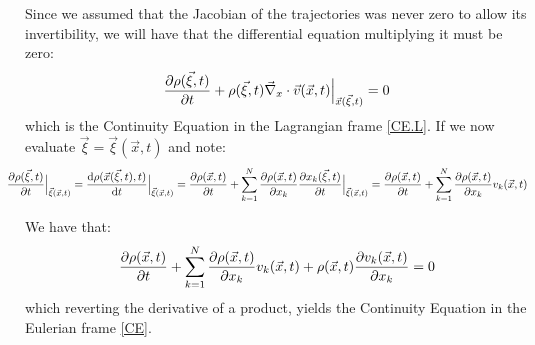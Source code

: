 \documentclass[11pt, a4paper]{article} %
\begin{document}
Since we assumed that the Jacobian of the trajectories was never zero to allow its invertibility, we will have that the differential equation multiplying it must be zero:
\begin{equation}
\pdv{\rho(\vec{\xi},t)}{t}+\rho(\vec{\xi},t)\vec{\nabla}_x\cdot\vec{v}(\vec{x},t)\Big\rvert_{\vec{x}(\vec{\xi},t)}=0
\end{equation}
which is the Continuity Equation in the Lagrangian frame \eqref{CE.L}. If we now evaluate $\vec{\xi}=\vec{\xi}(\vec{x},t)$ and note:
\begin{equation}
\hspace*{-0.6cm}\pdv{\rho(\vec{\xi},t)}{t}\Big\rvert_{\vec{\xi}(\vec{x},t)}=\dv{\rho(\vec{x}(\vec{\xi},t),t)}{t}\Big\rvert_{\vec{\xi}(\vec{x},t)}=\pdv{\rho(\vec{x},t)}{t}+\sum_{k=1}^N\pdv{\rho(\vec{x},t)}{x_k}\pdv{x_k(\vec{\xi},t)}{t}\Big\rvert_{\vec{\xi}(\vec{x},t)}=\pdv{\rho(\vec{x},t)}{t}+\sum_{k=1}^N\pdv{\rho(\vec{x},t)}{x_k}v_k(\vec{x},t)
\end{equation}

We have that:
\begin{equation}
\pdv{\rho(\vec{x},t)}{t}+\sum_{k=1}^N\pdv{\rho(\vec{x},t)}{x_k}v_k(\vec{x},t)+\rho(\vec{x},t)\pdv{v_k(\vec{x},t)}{x_k}=0
\end{equation}
which reverting the derivative of a product, yields the Continuity Equation in the Eulerian frame \eqref{CE}.
\end{document}

